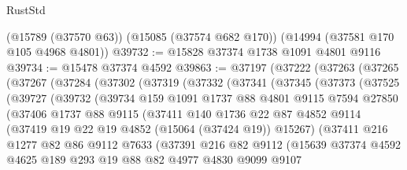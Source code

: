 \begin{lexlean}{RustStd}
\begin{coremodule}
    (@15789 (@37570 @63))
    (@15085 (@37574 @682 @170))
    (@14994 (@37581 @170 @105 @4968 @4801))
@39732 := @15828 @37374 @1738 @1091 @4801 @9116
@39734 := @15478 @37374 @4592
@39863 := @37197
    (@37222
      (@37263
        (@37265
          (@37267
            (@37284
              (@37302
                (@37319
                  (@37332
                    (@37341
                      (@37345
                        (@37373
                          (@37525
                            (@39727
                              (@39732
                                (@39734
                                  @159
                                  @1091
                                  @1737
                                  @88
                                  @4801
                                  @9115
                                  @7594
                                  @27850
                                  (@37406
                                    @1737
                                    @88
                                    @9115
                                    (@37411
                                      @140
                                      @1736
                                      @22
                                      @87
                                      @4852
                                      @9114
                                      (@37419 @19 @22 @19 @4852 (@15064 (@37424 @19)) @15267)
                                      (@37411
                                        @216
                                        @1277
                                        @82
                                        @86
                                        @9112
                                        @7633
                                        (@37391
                                          @216
                                          @82
                                          @9112
                                          (@15639
                                            @37374
                                            @4592
                                            @4625
                                            @189
                                            @293
                                            @19
                                            @88
                                            @82
                                            @4977
                                            @4830
                                            @9099
                                            @9107

\end{coremodule}
\end{lexlean}

